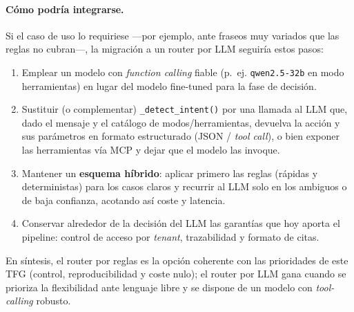 \paragraph{Cómo podría integrarse.} Si el caso de uso lo requiriese ---por ejemplo, ante fraseos muy variados que las reglas no cubran---, la migración a un router por LLM seguiría estos pasos:
\begin{enumerate}
    \item Emplear un modelo con \textit{function calling} fiable (p.~ej. \texttt{qwen2.5-32b} en modo herramientas) en lugar del modelo fine-tuned para la fase de decisión.
    \item Sustituir (o complementar) \texttt{\_detect\_intent()} por una llamada al LLM que, dado el mensaje y el catálogo de modos/herramientas, devuelva la acción y sus parámetros en formato estructurado (JSON / \textit{tool call}), o bien exponer las herramientas vía MCP y dejar que el modelo las invoque.
    \item Mantener un \textbf{esquema híbrido}: aplicar primero las reglas (rápidas y deterministas) para los casos claros y recurrir al LLM solo en los ambiguos o de baja confianza, acotando así coste y latencia.
    \item Conservar alrededor de la decisión del LLM las garantías que hoy aporta el pipeline: control de acceso por \textit{tenant}, trazabilidad y formato de citas.
\end{enumerate}

En síntesis, el router por reglas es la opción coherente con las prioridades de este TFG (control, reproducibilidad y coste nulo); el router por LLM gana cuando se prioriza la flexibilidad ante lenguaje libre y se dispone de un modelo con \textit{tool-calling} robusto.
